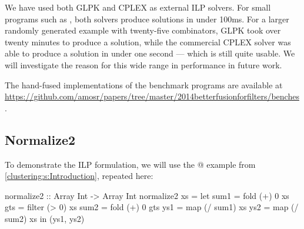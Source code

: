 We have used both GLPK and CPLEX as external ILP solvers.
For small programs such as \Hs@normalizeInc@, both solvers produce solutions in under 100ms.
For a larger randomly generated example with twenty-five combinators, GLPK took over twenty minutes to produce a solution, while the commercial CPLEX solver was able to produce a solution in under one second --- which is still quite usable.
We will investigate the reason for this wide range in performance in future work.


The hand-fused implementations of the benchmark programs are available at \url{https://github.com/amosr/papers/tree/master/2014betterfusionforfilters/benches}.



\subsection{Normalize2}
To demonstrate the ILP formulation, we will use the @ example from \cref{clustering:s:Introduction}, repeated here:
\begin{haskell}
normalize2 :: Array Int -> Array Int
normalize2 xs
 = let sum1 = fold   (+)  0   xs
       gts  = filter (>   0)  xs
       sum2 = fold   (+)  0   gts
       ys1  = map    (/ sum1) xs
       ys2  = map    (/ sum2) xs
   in (ys1, ys2)
\end{haskell}

